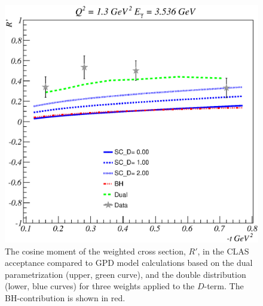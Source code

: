 \begin{figure}[t]
\includegraphics[scale=0.45]{R_dep_theta_var_6GeV.eps}
\caption{\small{The cosine moment of the weighted cross section, $R'$, in
the CLAS acceptance compared to GPD model calculations based on the dual
parametrization
\cite{Polyakov:2002wz,Guzey:2006xi,Guzey:2008ys,Polyakov:2008aa}
(upper, green curve), and the double distribution
\cite{Radyushkin:1998es} (lower, blue curves) for three weights applied
to the $D$-term. The BH-contribution is shown in red.}}
\label{fig:R_dep_theta_var_6GeV}
\end{figure}


